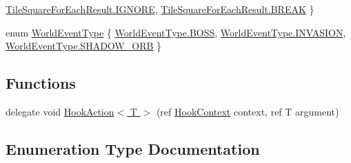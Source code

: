 \begin{DoxyCompactItemize}
\hyperlink{namespace_o_t_a_1_1_plugin_a5d0abd9c98c033ee111105f146881968aa2e843feab94ef623fea888f07c28696}{Tile\+Square\+For\+Each\+Result.\+I\+G\+N\+O\+R\+E}, 
\hyperlink{namespace_o_t_a_1_1_plugin_a5d0abd9c98c033ee111105f146881968a14d6a3e0201f58bfe7c01e775973e80e}{Tile\+Square\+For\+Each\+Result.\+B\+R\+E\+A\+K}
 \}
\item 
enum \hyperlink{namespace_o_t_a_1_1_plugin_a3eb70ca411b811f05acf9eaf7a270f53}{World\+Event\+Type} \{ \hyperlink{namespace_o_t_a_1_1_plugin_a3eb70ca411b811f05acf9eaf7a270f53af0523bf35faf77235783d0f3e43762d2}{World\+Event\+Type.\+B\+O\+S\+S}, 
\hyperlink{namespace_o_t_a_1_1_plugin_a3eb70ca411b811f05acf9eaf7a270f53acb7dc9a09afccc3afac59ef725b18ee0}{World\+Event\+Type.\+I\+N\+V\+A\+S\+I\+O\+N}, 
\hyperlink{namespace_o_t_a_1_1_plugin_a3eb70ca411b811f05acf9eaf7a270f53a3db1cd008bef08bd290b828bc6a78fb8}{World\+Event\+Type.\+S\+H\+A\+D\+O\+W\+\_\+\+O\+R\+B}
 \}
\end{DoxyCompactItemize}
\subsection*{Functions}
\begin{DoxyCompactItemize}
\item 
delegate void \hyperlink{namespace_o_t_a_1_1_plugin_a59f6f7fde9e7d8a453fbd75f0f86f880}{Hook\+Action$<$ T $>$} (ref \hyperlink{struct_o_t_a_1_1_plugin_1_1_hook_context}{Hook\+Context} context, ref T argument)
\end{DoxyCompactItemize}


\subsection{Enumeration Type Documentation}
\hypertarget{namespace_o_t_a_1_1_plugin_a1030f4a1f490e336a706685a767f6874}{}

